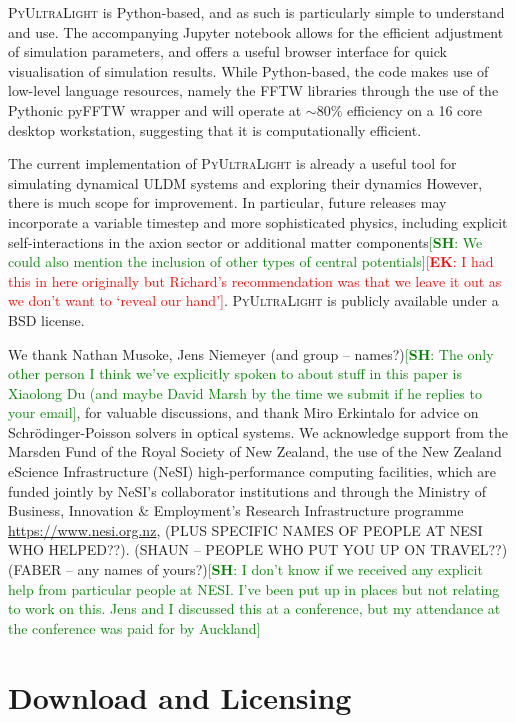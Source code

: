 \documentclass[a4paper,11pt]{article}
\newcommand{\PyUltraLight}{\textsc{PyUltraLight}\xspace}
\newcommand{\ek}[1]{\textcolor{red}{[{\bf EK}: #1]}}
\newcommand{\sh}[1]{\textcolor{green}{[{\bf SH}: #1]}}
\begin{document}
\PyUltraLight is Python-based, and as such is particularly simple to understand and use. The accompanying Jupyter notebook allows for the efficient adjustment of simulation parameters, and offers a useful browser interface for quick visualisation of simulation results. While Python-based, the code makes use of low-level language resources, namely the FFTW libraries through the use of the Pythonic pyFFTW wrapper and will operate at $\sim 80\%$ efficiency on a 16 core desktop workstation, suggesting that it is computationally efficient. 

The current implementation of \PyUltraLight is already a useful tool for simulating dynamical ULDM systems and exploring their dynamics However, there is much scope for  improvement. In particular, future releases may incorporate a variable timestep and more sophisticated physics, including explicit self-interactions in the axion sector or additional matter components\sh{We could also mention the inclusion of other types of central potentials}\ek{I had this in here originally but Richard's recommendation was that we leave it out as we don't want to `reveal our hand'}.  \PyUltraLight is publicly available under a BSD license. 

\acknowledgments

We thank Nathan Musoke, Jens Niemeyer (and group -- names?)\sh{The only other person I think we've explicitly spoken to about stuff in this paper is Xiaolong Du (and maybe David Marsh by the time we submit if he replies to your email}, for valuable discussions, and thank Miro Erkintalo for advice on Schr{\"o}dinger-Poisson solvers  in optical systems.  We acknowledge support from the Marsden Fund of the Royal Society of New Zealand, the use of the New Zealand eScience Infrastructure (NeSI) high-performance computing facilities, which are funded jointly by NeSI's collaborator institutions and through the Ministry of Business, Innovation \& Employment's Research Infrastructure programme \url{https://www.nesi.org.nz}, (PLUS SPECIFIC NAMES OF PEOPLE AT NESI WHO HELPED??). (SHAUN -- PEOPLE WHO PUT YOU UP ON TRAVEL??) (FABER -- any names of yours?)\sh{I don't know if we received any explicit help from particular people at NESI. I've been put up in places but not relating to work on this. Jens and I discussed this at a conference, but my attendance at the conference was paid for by Auckland}


\appendix
\section{Download and Licensing}
\end{document}
